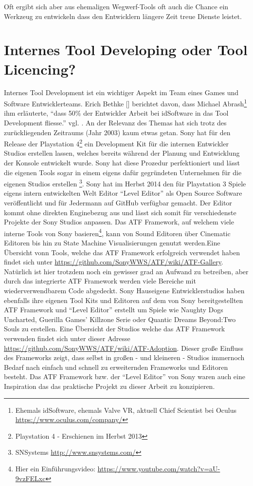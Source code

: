 \documentclass[pagesize, paper=a4, fontsize=12pt, titlepage=true, headings=small, headnosepline, abstractoff, liststotoc, nochapterprefix, plainheadsepline, twoside]{scrreprt}
\begin{document}
Oft ergibt sich aber aus ehemaligen Wegwerf-Tools oft auch die Chance ein Werkzeug zu entwickeln dass den Entwicklern längere Zeit treue Dienste leistet.

\section{Internes Tool Developing oder Tool Licencing?}
Internes Tool Development ist ein wichtiger Aspekt im Team eines Games und Software Entwicklerteams. Erich Bethke [] berichtet davon, dass Michael Abrash\footnote{Ehemals idSoftware, ehemals Valve VR, aktuell Chief Scientist bei Oculus \url{https://www.oculus.com/company/}} ihm erläuterte, “dass 50\% der Entwickler Arbeit bei idSoftware in das Tool Development fliesse.” vgl. \cite[S. 44]{Bethke2003}. An der Relevanz des Themas hat sich trotz des zurückliegenden Zeitraums (Jahr 2003) kaum etwas getan. Sony hat für den Release der Playstation 4\footnote{Playstation 4 - Erschienen im Herbst 2013} ein Development Kit  für die internen Entwickler Studios  erstellen lassen, welches bereits während der Planung und Entwicklung der Konsole entwickelt wurde. Sony hat diese Prozedur perfektioniert und lässt die eigenen Tools sogar in einem eigens dafür gegründeten Unternehmen für die eigenen Studios erstellen \footnote{SNSystems \url{http://www.snsystems.com/}}. Sony hat im Herbst 2014 den für Playstation 3 Spiele eigens intern entwickelten Welt Editor “Level Editor” als Open Source Software veröffentlicht und für Jedermann auf GitHub verfügbar gemacht. Der Editor kommt ohne direkten Enginebezug aus und lässt sich somit für verschiedenste Projekte der Sony Studios anpassen. Das ATF Framework, auf welchem viele interne Tools von Sony basieren\footnote{Hier ein Einführungsvideo: \url{https://www.youtube.com/watch?v=aU-9vzFELxc}}, kann von Sound Editoren über Cinematic Editoren bis hin zu State Machine Visualisierungen genutzt werden.Eine Übersicht vonn Tools, welche das ATF Framework erfolgreich verwendet haben findet sich unter \url{https://github.com/SonyWWS/ATF/wiki/ATF-Gallery}. Natürlich ist hier trotzdem noch ein gewisser grad an Aufwand zu betreiben, aber durch das integrierte ATF Framework werden viele Bereiche mit wiederverwendbarem Code abgedeckt. Sony Hauseigene  Entwicklerstudios haben ebenfalls ihre eigenen Tool Kits und Editoren auf dem von Sony bereitgestellten ATF Framework und “Level Editor” erstellt um Spiele wie Naughty Dogs Uncharted, Guerilla Games’ Killzone Serie oder Quantic Dreams Beyond:Two Souls zu erstellen. Eine Übersicht der Studios welche das ATF Framework verwenden findet sich unter dieser Adresse \url{https://github.com/SonyWWS/ATF/wiki/ATF-Adoption}. Dieser große Einfluss des Frameworks zeigt, dass selbst in großen - und kleineren - Studios immernoch Bedarf nach einfach und schnell zu erweiternden Frameworks und Editoren besteht. Das ATF Framework bzw. der “Level Editor” von Sony waren auch eine Inspiration das das praktische Projekt zu dieser Arbeit zu konzipieren.
\end{document}
